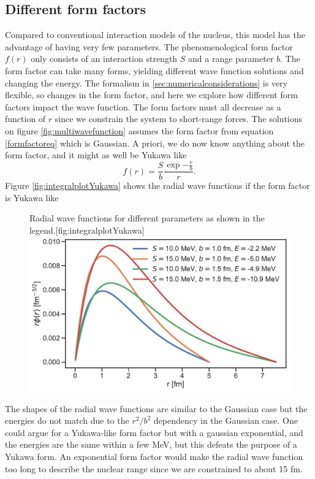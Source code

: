 \subsection{Different form factors}
Compared to conventional interaction models of the nucleus, this model has the advantage of having very few parameters. The phenomenological form factor $f(r)$ only consists of an interaction strength $S$ and a range parameter $b$. The form factor can take many forms, yielding different wave function solutions and changing the energy. The formalism in \ref{sec:numericalconsiderations} is very flexible, so changes in the form factor, and here we explore how different form factors impact the wave function. The form factors must all decrease as a function of $r$ since we constrain the system to short-range forces. The solutions on figure \ref{fig:multiwavefunction} assumes the form factor from equation \ref{formfactoreq} which is Gaussian. A priori, we do now know anything about the form factor, and it might as well be Yukawa like
\begin{equation}\label{YukawaForm}
	f(r) = \frac{S}{b}\frac{\exp{-\frac{r}{b}}}{r}.
\end{equation}
Figure \ref{fig:integralplotYukawa} shows the radial wave functions if the form factor is Yukawa like
\begin{figure}[H]
	\begin{sidecaption}{Radial wave functions for different parameters as shown in the legend.}[fig:integralplotYukawa]
		\includegraphics[width=\linewidth]{Figures/multiwavefunctionYukawa.pdf}
	\end{sidecaption}
\end{figure}
The shapes of the radial wave functions are similar to the Gaussian case but the energies do not match due to the $r^2/b^2$ dependency in the Gaussian case. One could argue for a Yukawa-like form factor but with a gaussian exponential, and the energies are the same within a few MeV, but this defeats the purpose of a Yukawa form. An exponential form factor would make the radial wave function too long to describe the nuclear range since we are constrained to about 15 fm.  

